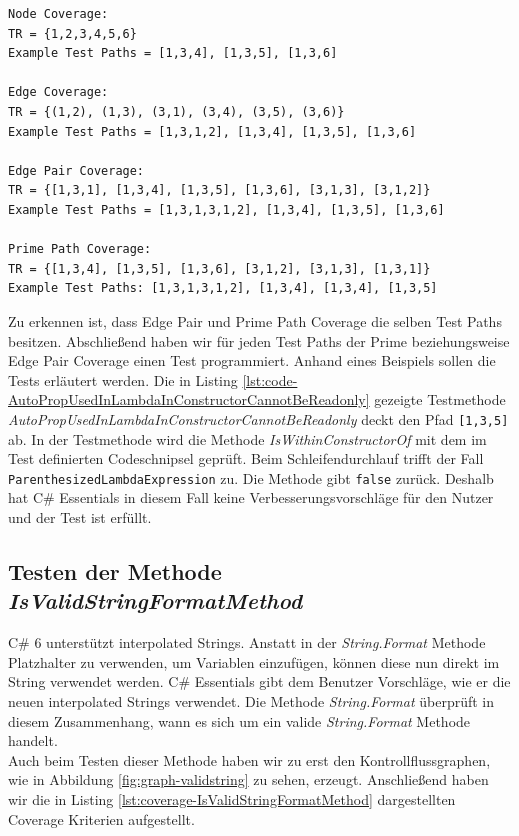 \begin{lstlisting}[caption={Coverage für die Mehtode \textit{IsWithinConstructorOf}},
label=lst:coverage-IsWithinConstructorOf]
Node Coverage:
TR = {1,2,3,4,5,6}
Example Test Paths = [1,3,4], [1,3,5], [1,3,6]

Edge Coverage:
TR = {(1,2), (1,3), (3,1), (3,4), (3,5), (3,6)}
Example Test Paths = [1,3,1,2], [1,3,4], [1,3,5], [1,3,6]

Edge Pair Coverage:
TR = {[1,3,1], [1,3,4], [1,3,5], [1,3,6], [3,1,3], [3,1,2]}
Example Test Paths = [1,3,1,3,1,2], [1,3,4], [1,3,5], [1,3,6]

Prime Path Coverage:
TR = {[1,3,4], [1,3,5], [1,3,6], [3,1,2], [3,1,3], [1,3,1]}
Example Test Paths: [1,3,1,3,1,2], [1,3,4], [1,3,4], [1,3,5]

\end{lstlisting}
\vspace{3ex}
Zu erkennen ist, dass Edge Pair und Prime Path Coverage die selben Test Paths besitzen. Abschließend haben wir für jeden Test Paths der Prime beziehungsweise Edge Pair Coverage einen Test programmiert. Anhand eines Beispiels sollen die Tests erläutert werden. Die in Listing \ref{lst:code-AutoPropUsedInLambdaInConstructorCannotBeReadonly} gezeigte Testmethode \textit{AutoPropUsedInLambdaInConstructorCannotBeReadonly} deckt den Pfad \texttt{[1,3,5]} ab. In der Testmethode wird die Methode \textit{IsWithinConstructorOf} mit dem im Test definierten Codeschnipsel geprüft. Beim Schleifendurchlauf trifft der Fall \texttt{ParenthesizedLambdaExpression} zu. Die Methode gibt \texttt{false} zurück. Deshalb hat C\# Essentials in diesem Fall keine Verbesserungsvorschläge für den Nutzer und der Test ist erfüllt.


\subsection{Testen der Methode \textit{IsValidStringFormatMethod}}
C\# 6 unterstützt interpolated Strings. Anstatt in der \textit{String.Format} Methode Platzhalter zu verwenden, um Variablen einzufügen, können diese nun direkt im String verwendet werden.\cite{csharp6} C\# Essentials gibt dem Benutzer Vorschläge, wie er die neuen interpolated Strings verwendet. Die Methode \textit{String.Format} überprüft in diesem Zusammenhang, wann es sich um ein valide \textit{String.Format} Methode handelt.\\
Auch beim Testen dieser Methode haben wir zu erst den Kontrollflussgraphen, wie in Abbildung \ref{fig:graph-validstring} zu sehen, erzeugt. Anschließend haben wir die in Listing \ref{lst:coverage-IsValidStringFormatMethod} dargestellten Coverage Kriterien aufgestellt.

